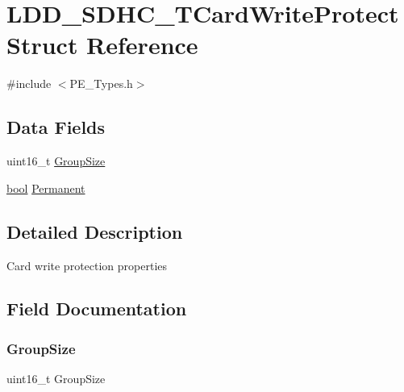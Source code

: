 \hypertarget{struct_l_d_d___s_d_h_c___t_card_write_protect}{}\section{L\+D\+D\+\_\+\+S\+D\+H\+C\+\_\+\+T\+Card\+Write\+Protect Struct Reference}
\label{struct_l_d_d___s_d_h_c___t_card_write_protect}


{\ttfamily \#include $<$P\+E\+\_\+\+Types.\+h$>$}

\subsection*{Data Fields}
\begin{DoxyCompactItemize}
\item 
uint16\+\_\+t \hyperlink{struct_l_d_d___s_d_h_c___t_card_write_protect_a654b8125f653cb37835730df0bc6a735}{Group\+Size}
\item 
\hyperlink{group___p_e___types__module_ga97a80ca1602ebf2303258971a2c938e2}{bool} \hyperlink{struct_l_d_d___s_d_h_c___t_card_write_protect_aba3541b5fb538841312161ab0e479606}{Permanent}
\end{DoxyCompactItemize}


\subsection{Detailed Description}
Card write protection properties 

\subsection{Field Documentation}
\mbox{\label{struct_l_d_d___s_d_h_c___t_card_write_protect_a654b8125f653cb37835730df0bc6a735}} 
\subsubsection{\texorpdfstring{Group\+Size}{GroupSize}}
{\footnotesize\ttfamily uint16\+\_\+t Group\+Size}

